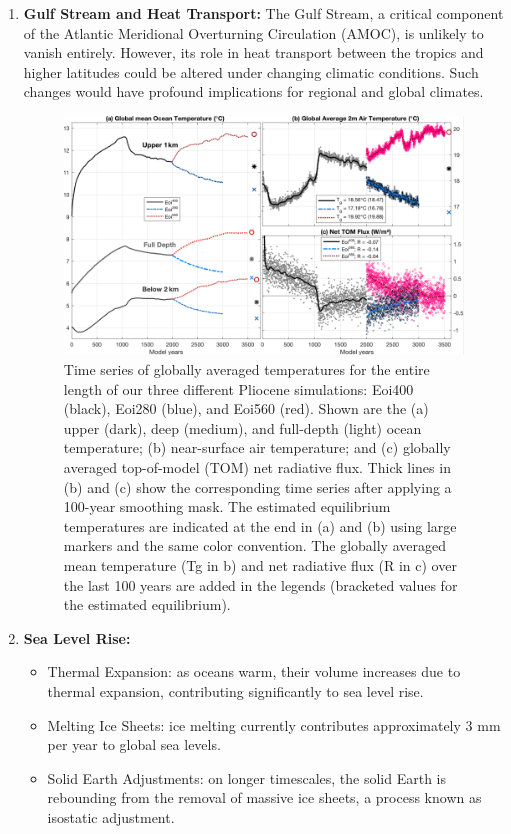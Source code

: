 \begin{enumerate}
	\item \textbf{Gulf Stream and Heat Transport:} The Gulf Stream, a critical component of the Atlantic Meridional Overturning Circulation (AMOC), is unlikely to vanish entirely. However, its role in heat transport between the tropics and higher latitudes could be altered under changing climatic conditions. Such changes would have profound implications for regional and global climates.
	      \begin{figure}[htpb]
		      \centering
		      \includegraphics[width=0.5\linewidth]{uploads/temperature.png}
		      \caption{Time series of globally averaged temperatures for the entire length of our three different Pliocene simulations: Eoi400 (black), Eoi280 (blue), and Eoi560 (red). Shown are the (a) upper (dark), deep (medium), and full-depth (light) ocean temperature; (b) near-surface air temperature; and (c) globally averaged top-of-model (TOM) net radiative flux. Thick lines in (b) and (c) show the corresponding time series after applying a 100-year smoothing mask. The estimated equilibrium temperatures are indicated at the end in (a) and (b) using large markers and the same color convention. The globally averaged mean temperature (Tg in b) and net radiative flux (R in c) over the last 100 years are added in the legends (bracketed values for the estimated equilibrium). }
		      \label{fig:temperature}
	      \end{figure}
	\item \textbf{Sea Level Rise:}
	      \begin{itemize}
		      \item Thermal Expansion: as oceans warm, their volume increases due to thermal expansion, contributing significantly to sea level rise.
		      \item Melting Ice Sheets: ice melting currently contributes approximately 3 mm per year to global sea levels.
		      \item Solid Earth Adjustments: on longer timescales, the solid Earth is rebounding from the removal of massive ice sheets, a process known as isostatic adjustment.

\end{itemize}
\end{enumerate}
